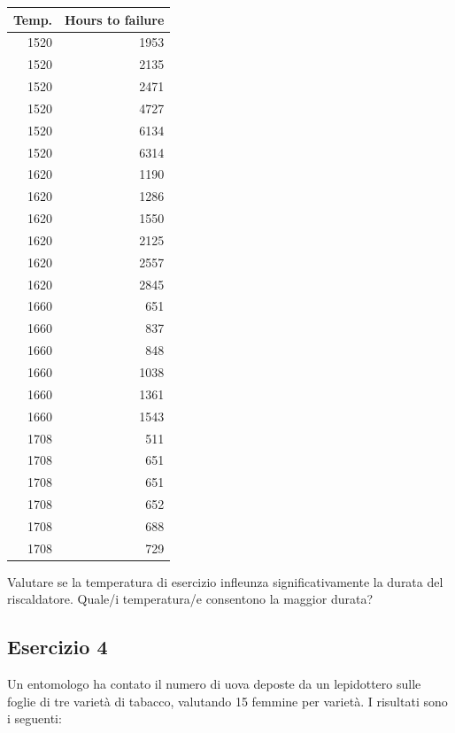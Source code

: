 \documentclass[a4paper,12pt,oneside]{book}
\begin{document}
\begin{longtable}[]{@{}rr@{}}
\toprule
Temp. & Hours to failure \\
\midrule
\endhead
1520 & 1953 \\
1520 & 2135 \\
1520 & 2471 \\
1520 & 4727 \\
1520 & 6134 \\
1520 & 6314 \\
1620 & 1190 \\
1620 & 1286 \\
1620 & 1550 \\
1620 & 2125 \\
1620 & 2557 \\
1620 & 2845 \\
1660 & 651 \\
1660 & 837 \\
1660 & 848 \\
1660 & 1038 \\
1660 & 1361 \\
1660 & 1543 \\
1708 & 511 \\
1708 & 651 \\
1708 & 651 \\
1708 & 652 \\
1708 & 688 \\
1708 & 729 \\
\bottomrule
\end{longtable}

Valutare se la temperatura di esercizio infleunza significativamente la durata del riscaldatore. Quale/i temperatura/e consentono la maggior durata?

\hypertarget{esercizio-4-3}{%
\subsection{Esercizio 4}\label{esercizio-4-3}}

Un entomologo ha contato il numero di uova deposte da un lepidottero sulle foglie di tre varietà di tabacco, valutando 15 femmine per varietà. I risultati sono i seguenti:
\end{document}
